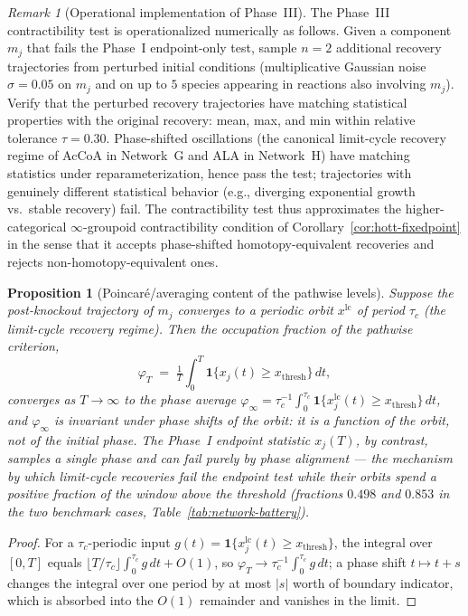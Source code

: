 \documentclass[11pt,a4paper]{article}
\theoremstyle{plain}
\newtheorem{proposition}[theorem]{Proposition}
\theoremstyle{definition}
\theoremstyle{remark}
\newtheorem{remark}[theorem]{Remark}
\begin{document}
\begin{remark}[Operational implementation of Phase~III]
\label{rem:phase3-operational}
The Phase~III contractibility test is operationalized numerically as
follows. Given a component $m_j$ that
fails the Phase~I endpoint-only test, sample $n = 2$ additional recovery
trajectories from perturbed initial conditions (multiplicative Gaussian
noise $\sigma = 0.05$ on $m_j$ and on up to $5$ species appearing in
reactions also involving $m_j$). Verify that the perturbed recovery
trajectories have matching statistical properties with the original
recovery: mean, max, and min within relative tolerance
$\tau = 0.30$. Phase-shifted oscillations (the canonical limit-cycle
recovery regime of AcCoA in Network~G and ALA in Network~H) have
matching statistics under reparameterization, hence pass the test;
trajectories with genuinely different statistical behavior (e.g.,
diverging exponential growth vs.\ stable recovery) fail. The
contractibility test thus approximates the higher-categorical
$\infty$-groupoid contractibility condition of Corollary~\ref{cor:hott-fixedpoint}
in the sense that it accepts phase-shifted homotopy-equivalent
recoveries and rejects non-homotopy-equivalent ones.
\end{remark}


\begin{proposition}[Poincar\'e/averaging content of the pathwise levels]
\label{prop:poincare-averaging}
Suppose the post-knockout trajectory of $m_j$ converges to a
periodic orbit $x^{\mathrm{lc}}$ of period $\tau_c$ (the
limit-cycle recovery regime). Then the occupation fraction of the
pathwise criterion,
\[
  \varphi_T \;=\; \tfrac{1}{T}\int_0^T
  \mathbf{1}\{x_j(t) \geq x_{\mathrm{thresh}}\}\,dt,
\]
converges as $T \to \infty$ to the phase average
$\varphi_\infty = \tau_c^{-1}\int_0^{\tau_c}
\mathbf{1}\{x^{\mathrm{lc}}_j(t) \geq x_{\mathrm{thresh}}\}\,dt$,
and $\varphi_\infty$ is invariant under phase shifts of the orbit:
it is a function of the orbit, not of the initial phase. The
Phase~I endpoint statistic $x_j(T)$, by contrast, samples a single
phase and can fail purely by phase alignment --- the mechanism by
which limit-cycle recoveries fail the endpoint test while their
orbits spend a positive fraction of the window above the threshold
(fractions $0.498$ and $0.853$ in the two benchmark cases,
Table~\ref{tab:network-battery}).
\end{proposition}

\begin{proof}
For a $\tau_c$-periodic input $g(t) = \mathbf{1}\{
x^{\mathrm{lc}}_j(t) \geq x_{\mathrm{thresh}} \}$, the integral
over $[0,T]$ equals $\lfloor T/\tau_c \rfloor \int_0^{\tau_c} g
\,dt + O(1)$, so $\varphi_T \to \tau_c^{-1}\int_0^{\tau_c} g\,dt$;
a phase shift $t \mapsto t + s$ changes the integral over one
period by at most $|s|$ worth of boundary indicator, which is
absorbed into the $O(1)$ remainder and vanishes in the limit.
\end{proof}
\end{document}
